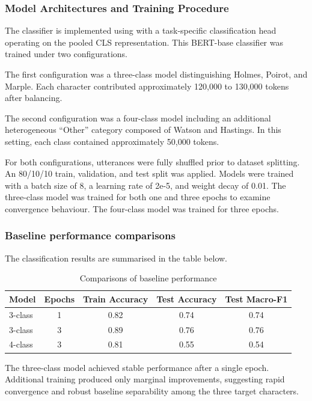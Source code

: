 \documentclass{article}
\begin{document}
\subsubsection{Model Architectures and Training Procedure}

The classifier is implemented using with a task-specific classification head operating on the pooled CLS representation. This BERT-base classifier was trained under two configurations.

The first configuration was a three-class model distinguishing Holmes, Poirot, and Marple. Each character contributed approximately 120,000 to 130,000 tokens after balancing.

The second configuration was a four-class model including an additional heterogeneous “Other” category composed of Watson and Hastings. In this setting, each class contained approximately 50,000 tokens.

For both configurations, utterances were fully shuffled prior to dataset splitting. An 80/10/10 train, validation, and test split was applied. Models were trained with a batch size of 8, a learning rate of 2e-5, and weight decay of 0.01. The three-class model was trained for both one and three epochs to examine convergence behaviour. The four-class model was trained for three epochs.

\subsubsection{Baseline performance comparisons}

The classification results are summarised in the table below.

\begin{table}[h]
    \centering
    \caption{Comparisons of baseline performance}
    \label{tab:placeholder_label}
    \begin{tabular}{lcccc}
        \hline
        Model & Epochs & Train Accuracy & Test Accuracy & Test Macro-F1 \\
        \hline
        3-class & 1 & 0.82 & 0.74 & 0.74 \\
        3-class & 3 & 0.89 & 0.76 & 0.76 \\
        4-class & 3 & 0.81 & 0.55 & 0.54 \\
        \hline
    \end{tabular}
\end{table}

The three-class model achieved stable performance after a single epoch. Additional training produced only marginal improvements, suggesting rapid convergence and robust baseline separability among the three target characters.
\end{document}
